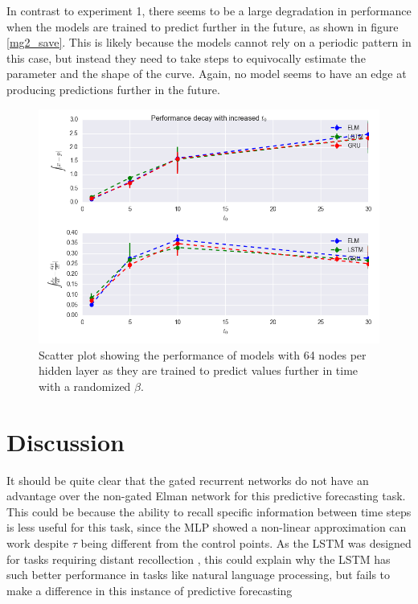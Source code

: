 \documentclass[11pt]{article}
\begin{document}
In contrast to experiment 1, there seems to be a large degradation in
performance when the models are trained to predict further in the
future, as shown in figure \ref{mg2_save}. This is likely because the models cannot rely on a periodic
pattern in this case, but instead they need to take steps to
equivocally estimate the parameter and the shape of the curve. Again,
no model seems to have an edge at producing predictions further in the future. 

  \begin{figure}
    \begin{center}
   \includegraphics[width=.96\textwidth]{figures/mg2_save.png}      
    \caption{Scatter plot showing the performance of models with 64 nodes
      per hidden layer as they are trained to predict values further
      in time with a randomized $\beta$.}
    \label{fig:mg2_save}
    \end{center}
  \end{figure}

\section {Discussion}
It should be quite clear that the gated recurrent networks do not have
an advantage over the non-gated Elman network for this predictive
forecasting task. This could be because the ability to recall specific 
information between time steps is less useful for this task, since the
MLP showed a non-linear approximation can work despite $\tau$ being
different from the control points. As the LSTM was designed for tasks requiring distant recollection
\cite{LSTM}, this could explain why the LSTM has such better
performance in tasks like natural language processing, but fails to make a difference in this
instance of predictive forecasting
\end{document}
